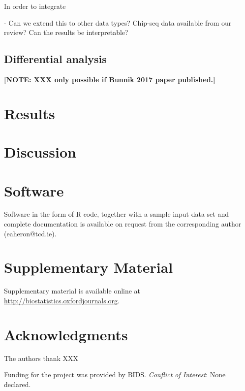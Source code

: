 \documentclass[letterpaper,12pt]{article}
\newcommand{\note}[1]{\textbf{[NOTE: #1]}}
\begin{document}
In order to integrate


- Can we extend this to other data types? Chip-seq data available from our
review? Can the results be interpretable?

\subsection{Differential analysis}
\note{XXX only possible if Bunnik 2017 paper published.}

\section{Results}
\label{sec3}

\section{Discussion}
\label{sec4}



\section{Software}
\label{sec5}

Software in the form of R code, together with a sample
input data set and complete documentation is available on
request from the corresponding author (eaheron@tcd.ie).


\section{Supplementary Material}
\label{sec6}

Supplementary material is available online at
\url{http://biostatistics.oxfordjournals.org}.


\section*{Acknowledgments}

The authors thank XXX

Funding for the project was provided by BIDS.
{\it Conflict of Interest}: None declared.






\begin{figure}[!p]
\centering
\caption{}
\label{Fig1}
\end{figure}
\end{document}

